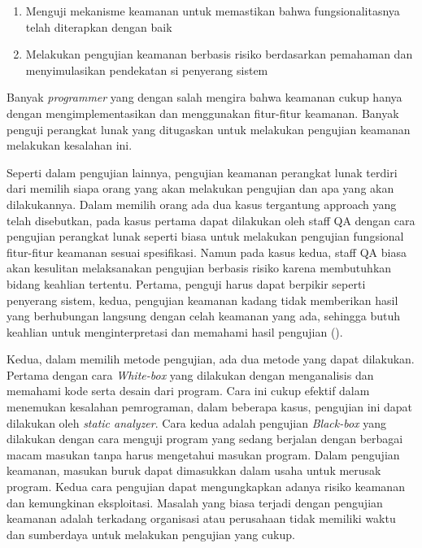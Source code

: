 \begin{enumerate}
  \item Menguji mekanisme keamanan untuk memastikan bahwa fungsionalitasnya telah diterapkan dengan baik
  \item Melakukan pengujian keamanan berbasis risiko berdasarkan pemahaman dan menyimulasikan pendekatan si penyerang sistem
\end{enumerate}

Banyak \emph{programmer} yang dengan salah mengira bahwa keamanan cukup hanya dengan mengimplementasikan dan
menggunakan fitur-fitur keamanan. Banyak penguji perangkat lunak yang ditugaskan untuk melakukan
pengujian keamanan melakukan kesalahan ini.

Seperti dalam pengujian lainnya, pengujian keamanan perangkat lunak terdiri dari memilih
siapa orang yang akan melakukan pengujian dan apa yang akan dilakukannya.
Dalam memilih orang ada dua kasus tergantung approach yang telah disebutkan,
pada kasus pertama dapat dilakukan oleh staff QA dengan cara pengujian
perangkat lunak seperti biasa untuk melakukan pengujian fungsional
fitur-fitur keamanan sesuai spesifikasi.
Namun pada kasus kedua, staff QA biasa akan kesulitan melaksanakan pengujian berbasis risiko
karena membutuhkan bidang keahlian tertentu.
Pertama, penguji harus dapat berpikir seperti penyerang sistem,
kedua, pengujian keamanan kadang tidak memberikan hasil yang berhubungan langsung dengan
celah keamanan yang ada, sehingga butuh keahlian untuk
menginterpretasi dan memahami hasil pengujian (\cite{grawsectest}).

Kedua, dalam memilih metode pengujian, ada dua metode yang dapat dilakukan.
Pertama dengan cara \emph{White-box} yang dilakukan dengan menganalisis dan memahami
kode serta desain dari program.
Cara ini cukup efektif dalam menemukan kesalahan pemrograman,
dalam beberapa kasus, pengujian ini dapat dilakukan oleh \emph{static analyzer}.
Cara kedua adalah pengujian \emph{Black-box} yang dilakukan dengan cara menguji program
yang sedang berjalan dengan berbagai macam masukan tanpa harus mengetahui masukan program.
Dalam pengujian keamanan, masukan buruk dapat dimasukkan dalam usaha untuk merusak program.
Kedua cara pengujian dapat mengungkapkan adanya risiko keamanan dan kemungkinan eksploitasi.
Masalah yang biasa terjadi dengan pengujian keamanan adalah terkadang organisasi atau perusahaan
tidak memiliki waktu dan sumberdaya untuk melakukan pengujian yang cukup.

